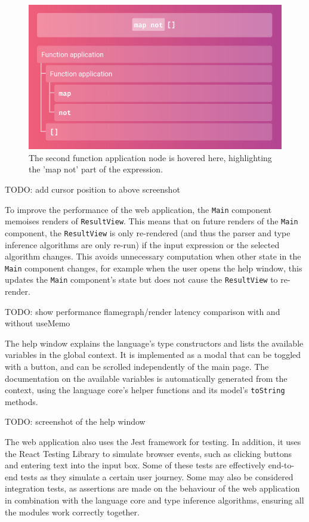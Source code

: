 \documentclass[a4paper,fleqn,oneside,12pt]{report}
\begin{document}
{\centering \begin{figure}[h!]
  \centering
  \includegraphics[width=0.868\linewidth]{images/image2.png}
  \caption{The second function application node is hovered here, highlighting the 'map not' part of the expression.}
\end{figure} \par}

TODO: add cursor position to above screenshot

To improve the performance of the web application, the \texttt{Main} component memoises renders of \texttt{ResultView}. This means that on future renders of the \texttt{Main} component, the \texttt{ResultView} is only re-rendered (and thus the parser and type inference algorithms are only re-run) if the input expression or the selected algorithm changes. This avoids unnecessary computation when other state in the \texttt{Main} component changes, for example when the user opens the help window, this updates the \texttt{Main} component's state but does not cause the \texttt{ResultView} to re-render.

TODO: show performance flamegraph/render latency comparison with and without useMemo

The help window explains the language's type constructors and lists the available variables in the global context. It is implemented as a modal that can be toggled with a button, and can be scrolled independently of the main page. The documentation on the available variables is automatically generated from the context, using the language core's helper functions and its model's \texttt{toString} methods.

TODO: screenshot of the help window

The web application also uses the Jest framework for testing. In addition, it uses the React Testing Library to simulate browser events, such as clicking buttons and entering text into the input box. Some of these tests are effectively end-to-end tests as they simulate a certain user journey. Some may also be considered integration tests, as assertions are made on the behaviour of the web application in combination with the language core and type inference algorithms, ensuring all the modules work correctly together.
\end{document}
